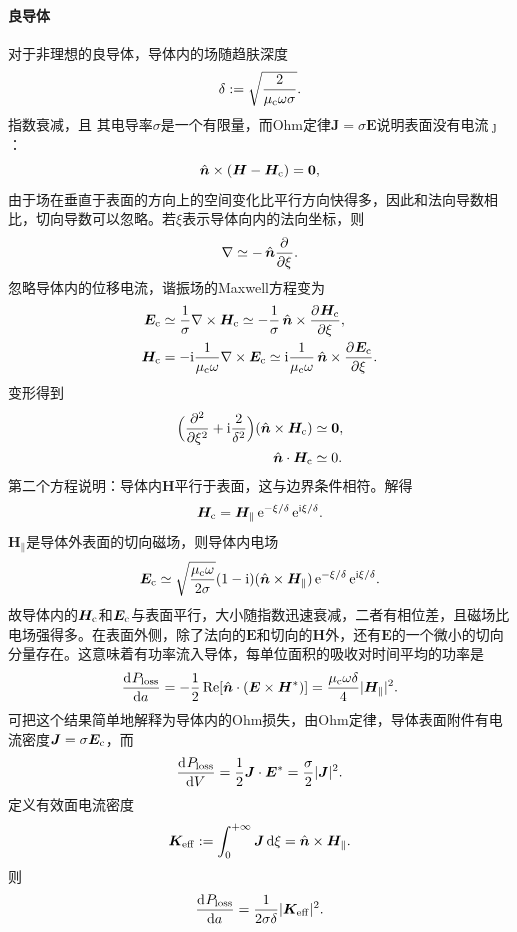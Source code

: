 \paragraph{良导体}

对于非理想的良导体，导体内的场随趋肤深度
\begin{equation}
    \delta:=\sqrt{\frac2{\mu\c\omega\sigma}}.
\end{equation}
指数衰减，且
其电导率$\sigma$是一个有限量，而Ohm定律$\bm J=\sigma\bm E$说明表面没有电流$\bm\jmath$：
\[
    \uvec n\times(\bm H-\bm H\c)=\bm 0,
\]
由于场在垂直于表面的方向上的空间变化比平行方向快得多，因此和法向导数相比，切向导数可以忽略。若$\xi$表示导体向内的法向坐标，则
\[
    \nabla\simeq-\uvec n\pp\xi.
\]
忽略导体内的位移电流，谐振场的Maxwell方程变为
\begin{align*}
    \bm E\c&\simeq\frac1\sigma\curl\bm H\c\simeq-\frac1\sigma\uvec n\times\pv{\bm H\c}\xi,\\
    \bm H\c&=-\i\frac1{\mu\c\omega}\curl\bm E\c\simeq\i\frac1{\mu\c\omega}\uvec n\times\pv{\bm E\c}\xi.
\end{align*}
变形得到
\begin{align*}
    \Bigkh{\pp[2]\xi+\i\frac2{\delta^2}}(\uvec n\times\bm H\c)&\simeq\bm 0,\\
    \uvec n\cdot\bm H\c&\simeq 0.
\end{align*}
第二个方程说明：导体内$\bm H$平行于表面，这与边界条件相符。解得
\begin{equation}
    \bm H\c=\bm H_\parallel\e{-\xi/\delta}\e{\i\xi/\delta}.
\end{equation}
$\bm H_\parallel$是导体外表面的切向磁场，则导体内电场
\begin{equation}
    \bm E\c\simeq\sqrt{\frac{\mu\c\omega}{2\sigma}}(1-\i)(\uvec n\times\bm H_\parallel)\e{-\xi/\delta}\e{\i\xi/\delta}.
\end{equation}
故导体内的$\bm H\c$和$\bm E\c$与表面平行，大小随指数迅速衰减，二者有相位差，且磁场比电场强得多。在表面外侧，除了法向的$\bm E$和切向的$\bm H$外，还有$\bm E$的一个微小的切向分量存在。这意味着有功率流入导体，每单位面积的吸收对时间平均的功率是
\begin{equation}
    \dv{P_\text{loss}}a=-\frac12\Re[\uvec n\cdot(\bm E\times\bm H\cj)]=\frac{\mu\c\omega\delta}4|\bm H_\parallel|^2.
\end{equation}
可把这个结果简单地解释为导体内的Ohm损失，由Ohm定律，导体表面附件有电流密度$\bm J=\sigma\bm E\c$，而
\[
    \dv{P_\text{loss}}V=\frac12\bm J\cdot\bm E\cj=\frac\sigma 2|\bm J|^2.
\]
定义有效面电流密度
\[
    \bm K\eff:=\int\zti\bm J\d\xi=\uvec n\times\bm H_\parallel.
\]
则
\[
    \dv{P_\text{loss}}a=\frac1{2\sigma\delta}|\bm K\eff|^2.
\]
